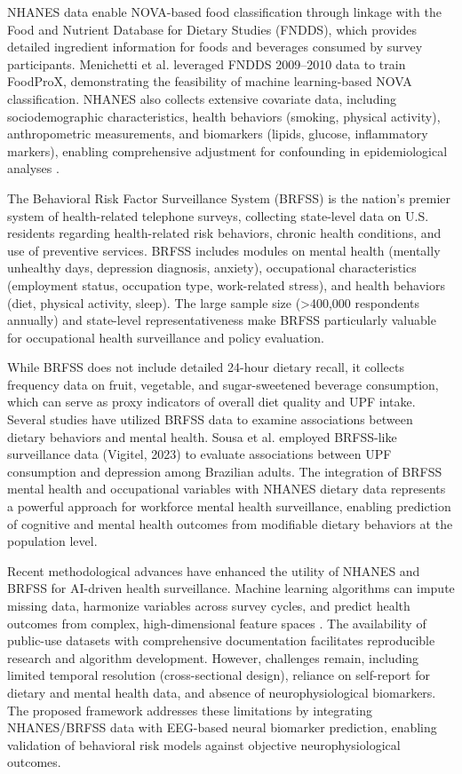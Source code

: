 \documentclass[journal,twoside,10pt]{IEEEtran}
\begin{document}
NHANES data enable NOVA-based food classification through linkage with the Food and Nutrient Database for Dietary Studies (FNDDS), which provides detailed ingredient information for foods and beverages consumed by survey participants. Menichetti et al. \cite{ref48} leveraged FNDDS 2009--2010 data to train FoodProX, demonstrating the feasibility of machine learning-based NOVA classification. NHANES also collects extensive covariate data, including sociodemographic characteristics, health behaviors (smoking, physical activity), anthropometric measurements, and biomarkers (lipids, glucose, inflammatory markers), enabling comprehensive adjustment for confounding in epidemiological analyses \cite{ref18,ref20,ref26,ref47}.

The Behavioral Risk Factor Surveillance System (BRFSS) is the nation's premier system of health-related telephone surveys, collecting state-level data on U.S. residents regarding health-related risk behaviors, chronic health conditions, and use of preventive services. BRFSS includes modules on mental health (mentally unhealthy days, depression diagnosis, anxiety), occupational characteristics (employment status, occupation type, work-related stress), and health behaviors (diet, physical activity, sleep). The large sample size (>400,000 respondents annually) and state-level representativeness make BRFSS particularly valuable for occupational health surveillance and policy evaluation.

While BRFSS does not include detailed 24-hour dietary recall, it collects frequency data on fruit, vegetable, and sugar-sweetened beverage consumption, which can serve as proxy indicators of overall diet quality and UPF intake. Several studies have utilized BRFSS data to examine associations between dietary behaviors and mental health. Sousa et al. \cite{ref19} employed BRFSS-like surveillance data (Vigitel, 2023) to evaluate associations between UPF consumption and depression among Brazilian adults. The integration of BRFSS mental health and occupational variables with NHANES dietary data represents a powerful approach for workforce mental health surveillance, enabling prediction of cognitive and mental health outcomes from modifiable dietary behaviors at the population level.

Recent methodological advances have enhanced the utility of NHANES and BRFSS for AI-driven health surveillance. Machine learning algorithms can impute missing data, harmonize variables across survey cycles, and predict health outcomes from complex, high-dimensional feature spaces \cite{ref2,ref5,ref48}. The availability of public-use datasets with comprehensive documentation facilitates reproducible research and algorithm development. However, challenges remain, including limited temporal resolution (cross-sectional design), reliance on self-report for dietary and mental health data, and absence of neurophysiological biomarkers. The proposed framework addresses these limitations by integrating NHANES/BRFSS data with EEG-based neural biomarker prediction, enabling validation of behavioral risk models against objective neurophysiological outcomes.
\end{document}
